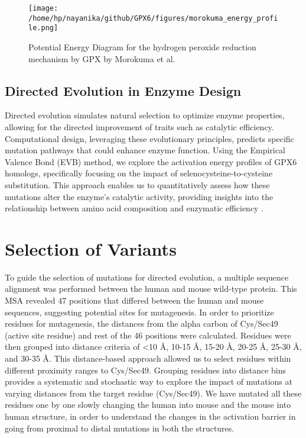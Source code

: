 \documentclass[journal=jacsat,manuscript=article]{achemso}
\begin{document}
  \begin{figure}[h]
  \texttt{[image: /home/hp/nayanika/github/GPX6/figures/morokuma\_energy\_profile.png]}
  \caption{Potential Energy Diagram for the hydrogen peroxide reduction mechanism by GPX by Morokuma et al.}
  \label{fig:figure3}
  \end{figure}

\subsection{Directed Evolution in Enzyme Design}

Directed evolution simulates natural selection to optimize enzyme properties, allowing for the directed improvement of traits such as catalytic efficiency. Computational design, leveraging these evolutionary principles, predicts specific mutation pathways that could enhance enzyme function. Using the Empirical Valence Bond (EVB) method, we explore the activation energy profiles of GPX6 homologs, specifically focusing on the impact of selenocysteine-to-cysteine substitution. This approach enables us to quantitatively assess how these mutations alter the enzyme’s catalytic activity, providing insights into the relationship between amino acid composition and enzymatic efficiency \cite{Starr2016, Storz2018}.

\section{Selection of Variants}

To guide the selection of mutations for directed evolution, a multiple sequence alignment was performed between the human and mouse wild-type protein. This MSA revealed 47 positions that differed between the human and mouse sequences, suggesting potential sites for mutagenesis. In order to prioritize residues for mutagenesis, the distances from the alpha carbon of Cys/Sec49 (active site residue) and rest of the 46 positions were calculated. Residues were then grouped into distance criteria of <10 Å, 10-15 Å, 15-20 Å, 20-25 Å, 25-30 Å, and 30-35 Å. This distance-based approach allowed us to select residues within different proximity ranges to Cys/Sec49. Grouping residues into distance bins provides a systematic and stochastic way to explore the impact of mutations at varying distances from the target residue (Cys/Sec49). We have mutated all these residues one by one slowly changing the human into mouse and the mouse into human structure, in order to understand the changes in the activation barrier in going from proximal to distal mutations in both the structures.
\end{document}
